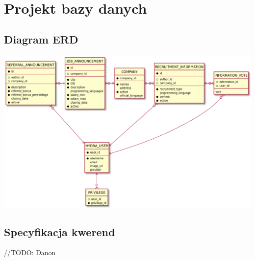 \documentclass{scrreprt}
\begin{document}
\chapter{Projekt bazy danych}

\section{Diagram ERD}
\includegraphics[width=\textwidth, keepaspectratio]{graphics/hydra_db_erd.pdf}

\section{Specyfikacja kwerend}
//TODO: Danon
\end{document}
